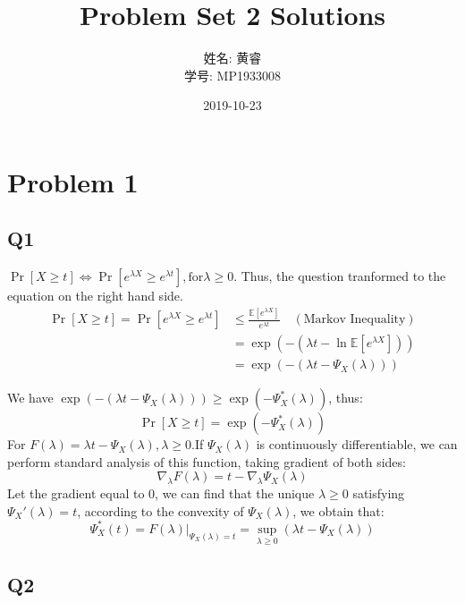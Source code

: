 \documentclass[a4paper, 12pt, titlepage]{article}
\title{Problem Set 2 Solutions}
\author{姓名: 黄睿 \\ 学号: MP1933008}
\date{2019-10-23}
\begin{document}
\maketitle

\section{Problem 1}

\subsection{Q1}
$\Pr \left[ X \geq t \right] \Leftrightarrow \Pr \left[ e^{\lambda X} \geq e^{\lambda t} \right], \text{for} \lambda \geq 0.$
Thus, the question tranformed to the equation on the right hand side.
\begin{equation}
    \begin{aligned}
        \Pr \left[ X \geq t \right] = \Pr \left[ e^{\lambda X} \geq e^{\lambda t} \right] &\leq \frac{\mathbb{ E } \left[ e^{\lambda X} \right] }{e^{\lambda t}} \quad \left( \text{Markov Inequality} \right) \\
                                                            &= \exp \left(- \left(\lambda t - \ln{\mathbb{E} \left[ e^{\lambda X} \right]} \right) \right) \\
                                                            &= \exp \left(- \left(\lambda t - \Psi_{X}(\lambda) \right) \right)                                                         
    \end{aligned}
\end{equation}

We have $\exp \left(- \left(\lambda t - \Psi_{X}(\lambda) \right) \right) \geq \exp \left( - \Psi_{X}^{*}(\lambda) \right)$, thus:
\[
    \Pr \left[ X \geq t \right] = \exp \left( - \Psi_{X}^{*}(\lambda) \right)
\]
For $F(\lambda) = \lambda t - \Psi_{X}(\lambda), \lambda \geq 0 $.If $\Psi_{X}(\lambda)$ is continuously differentiable, we can perform standard analysis of this function, taking gradient of both sides:
\[
    \nabla_{\lambda} F(\lambda) = t - \nabla_{\lambda} \Psi_{X}(\lambda)  
\]
Let the gradient equal to 0, we can find that the unique $\lambda \geq 0$ satisfying $\Psi_{X}'(\lambda) = t$, according to the convexity of $\Psi_{X}(\lambda)$, we obtain that: 
\[
    \Psi_{X}^{*}(t) = F(\lambda)|_{\Psi_{X}(\lambda) = t} = \sup_{\lambda \geq 0} \left( \lambda t - \Psi_{X}(\lambda) \right)  
\]

\subsection{Q2}
\end{document}
